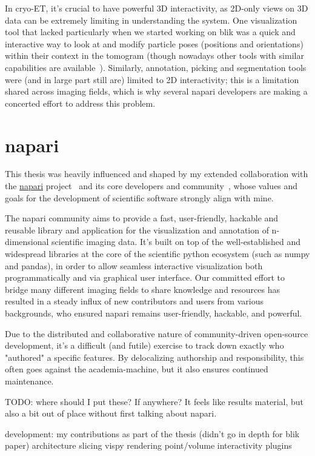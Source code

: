 In cryo-ET, it's crucial to have powerful 3D interactivity, as 2D-only views on 3D data can be extremely limiting in understanding the system.
One visualization tool that lacked particularly when we started working on blik was a quick and interactive way to look at and modify particle poses (positions and orientations) within their context in the tomogram (though nowadays other tools with similar capabilities are available~\cite{ermelArtiaXElectronTomography2022}).
Similarly, annotation, picking and segmentation tools were (and in large part still are) limited to 2D interactivity; this is a limitation shared across imaging fields, which is why several napari developers are making a concerted effort to address this problem.

\section{napari}

This thesis was heavily influenced and shaped by my extended collaboration with the \href{https://napari.org/}{napari} project~\cite{thenaparicommunityNapariMultidimensionalImage2024} and its core developers and community~\cite{thenaparicommunityCommunityNapari2024}, whose values and goals for the development of scientific software strongly align with mine.

The napari community aims to provide a fast, user-friendly, hackable and reusable library and application for the visualization and annotation of n-dimensional scientific imaging data.
It's built on top of the well-established and widespread libraries at the core of the scientific python ecosystem (such as numpy and pandas), in order to allow seamless interactive visualization both programmatically and via graphical user interface.
Our committed effort to bridge many different imaging fields to share knowledge and resources has resulted in a steady influx of new contributors and users from various backgrounds, who ensured napari remains user-friendly, hackable, and powerful.

Due to the distributed and collaborative nature of community-driven open-source development, it's a difficult (and futile) exercise to track down exactly who "authored" a specific features.
By delocalizing authorship and responsibility, this often goes against the academia-machine, but it also ensures continued maintenance.

TODO: where should I put these? If anywhere? It feels like results material, but also a bit out of place without first talking about napari.
\begin{outline}
\1 development: my contributions as part of the thesis (didn't go in depth for blik paper)
    \2 architecture
    \2 slicing
    \2 vispy rendering
    \2 point/volume interactivity
    \2 plugins
\end{outline}

